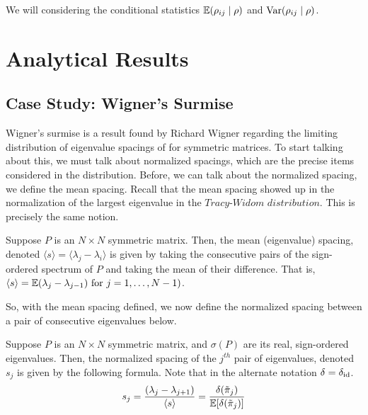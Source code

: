 We will considering the conditional statistics $\mathbb{E}({\rho}_{ij} \mid \rho)$ and $\text{Var}({\rho}_{ij} \mid \rho)$.


\section{Analytical Results}


\subsection{Case Study: Wigner's Surmise}

Wigner's surmise is a result found by Richard Wigner regarding the limiting distribution of eigenvalue spacings of for symmetric matrices. To start talking about this, we must talk about normalized spacings, which are the precise items considered in the distribution. Before, we can talk about the normalized spacing, we define the mean spacing. Recall that the mean spacing showed up in the normalization of the largest eigenvalue in the $\textit{Tracy-Widom distribution}$. This is precisely the same notion.

\begin{definition}
Suppose $P$ is an $N \times N$ symmetric matrix. Then, the mean (eigenvalue) spacing, denoted $\langle s \rangle = \langle \lambda_j - \lambda_i \rangle$ is given by taking the consecutive pairs of the sign-ordered spectrum of $P$ and taking the mean of their difference. That is, $\langle s \rangle = \mathbb{E}(\lambda_j - \lambda_{j-1}) \text{ for } j = 1,\dots,N-1)$.
\end{definition}

So, with the mean spacing defined, we now define the normalized spacing between a pair of consecutive eigenvalues below.

\begin{definition}
Suppose $P$ is an $N \times N$ symmetric matrix, and $\sigma(P)$ are its real, sign-ordered eigenvalues. Then, the normalized spacing of the $j^{th}$ pair of eigenvalues, denoted $s_j$ is given by the following formula. Note that in the alternate notation $\delta = \delta_{\text{id}}$.
$$s_j = \frac{(\lambda_j - \lambda_{j+1})}{\langle s \rangle} = \frac{\delta({\tilde{\pi}}_{j})}{\mathbb{E}[\delta({\tilde{\pi}}_{j})]}$$
\end{definition}

